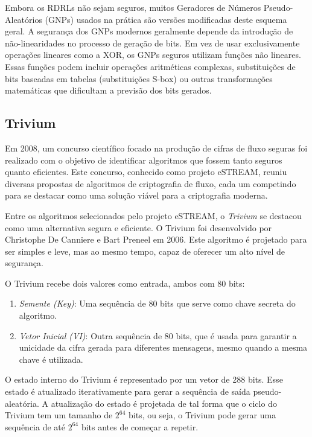 Embora os RDRLs não sejam seguros, muitos Geradores de Números Pseudo-Aleatórios (GNPs) usados na prática são versões modificadas deste esquema geral.
A segurança dos GNPs modernos geralmente depende da introdução de não-linearidades no processo de geração de bits.
Em vez de usar exclusivamente operações lineares como a XOR, os GNPs seguros utilizam funções não lineares.
Essas funções podem incluir operações aritméticas complexas, substituições de bits baseadas em tabelas (substituições S-box) ou outras transformações matemáticas que dificultam a previsão dos bits gerados.

\subsection{Trivium}
\label{sec:trivium}

Em 2008, um concurso científico focado na produção de cifras de fluxo seguras foi realizado com o objetivo de identificar algoritmos que fossem tanto seguros quanto eficientes.
Este concurso, conhecido como projeto eSTREAM, reuniu diversas propostas de algoritmos de criptografia de fluxo, cada um competindo para se destacar como uma solução viável para a criptografia moderna.

Entre os algoritmos selecionados pelo projeto eSTREAM, o {\em Trivium} \cite{DeCanniere06} se destacou como uma alternativa segura e eficiente.
O Trivium foi desenvolvido por Christophe De Canniere e Bart Preneel em 2006.
Este algoritmo é projetado para ser simples e leve, mas ao mesmo tempo, capaz de oferecer um alto nível de segurança.

O Trivium recebe dois valores como entrada, ambos com 80 bits:
\begin{enumerate}
    \item {\em Semente (Key)}: Uma sequência de 80 bits que serve como chave secreta do algoritmo.
    \item {\em Vetor Inicial (VI)}: Outra sequência de 80 bits, que é usada para garantir a unicidade da cifra gerada para diferentes mensagens, mesmo quando a mesma chave é utilizada.
\end{enumerate}

O estado interno do Trivium é representado por um vetor de 288 bits.
Esse estado é atualizado iterativamente para gerar a sequência de saída pseudo-aleatória.
A atualização do estado é projetada de tal forma que o ciclo do Trivium tem um tamanho de $2^{64}$ bits, ou seja, o Trivium pode gerar uma sequência de até $2^{64}$ bits antes de começar a repetir.

